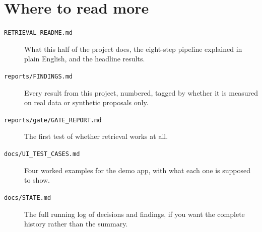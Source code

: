 \documentclass[11pt,a4paper]{article}
\begin{document}
\section{Where to read more}

\begin{description}
  \item[\texttt{RETRIEVAL\_README.md}] What this half of the project does,
    the eight-step pipeline explained in plain English, and the headline
    results.
  \item[\texttt{reports/FINDINGS.md}] Every result from this project,
    numbered, tagged by whether it is measured on real data or synthetic
    proposals only.
  \item[\texttt{reports/gate/GATE\_REPORT.md}] The first test of whether
    retrieval works at all.
  \item[\texttt{docs/UI\_TEST\_CASES.md}] Four worked examples for the demo
    app, with what each one is supposed to show.
  \item[\texttt{docs/STATE.md}] The full running log of decisions and
    findings, if you want the complete history rather than the summary.
\end{description}
\end{document}
